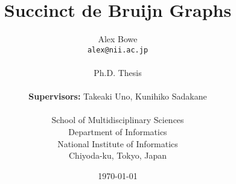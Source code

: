 \documentclass[11pt,a4paper]{report}
\begin{document}
\title{Succinct de Bruijn Graphs}
\author{Alex Bowe\\
\texttt{alex@nii.ac.jp} \\ \\
Ph.D. Thesis\\ \\
\textbf{Supervisors:} Takeaki Uno, Kunihiko Sadakane\\ \\
School of Multidisciplinary Sciences \\
Department of Informatics \\
National Institute of Informatics \\
Chiyoda-ku, Tokyo, Japan}

\date{\today}

\maketitle


%

\setcounter{tocdepth}{1}
\newpage
\tableofcontents
\newpage





%
%
%
%
%
%
%
%
%

%




\end{document}
